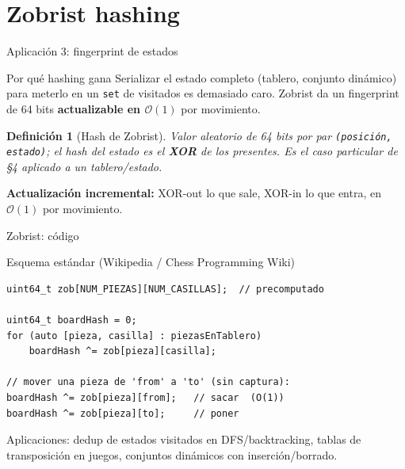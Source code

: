 \documentclass{beamer}
\newtheorem{definicion}{Definición}
\begin{document}
\section{Zobrist hashing}

\begin{frame}{Aplicación 3: fingerprint de estados}
\begin{block}{Por qué hashing gana}
Serializar el estado completo (tablero, conjunto dinámico) para meterlo en un \texttt{set} de visitados es demasiado caro. Zobrist da un fingerprint de 64 bits \textbf{actualizable en $\mathcal{O}(1)$} por movimiento.
\end{block}
\begin{definicion}[Hash de Zobrist]
Valor aleatorio de 64 bits por par \texttt{(posición, estado)}; el hash del estado es el \textbf{XOR} de los presentes. Es el caso particular de \S4 aplicado a un tablero/estado.
\end{definicion}
\textbf{Actualización incremental:} XOR-out lo que sale, XOR-in lo que entra, en $\mathcal{O}(1)$ por movimiento.
\end{frame}

\begin{frame}[fragile]{Zobrist: código}
\begin{exampleblock}{Esquema estándar (Wikipedia / Chess Programming Wiki)}
\begin{verbatim}
uint64_t zob[NUM_PIEZAS][NUM_CASILLAS];  // precomputado

uint64_t boardHash = 0;
for (auto [pieza, casilla] : piezasEnTablero)
    boardHash ^= zob[pieza][casilla];

// mover una pieza de 'from' a 'to' (sin captura):
boardHash ^= zob[pieza][from];   // sacar  (O(1))
boardHash ^= zob[pieza][to];     // poner
\end{verbatim}
\end{exampleblock}
Aplicaciones: dedup de estados visitados en DFS/backtracking, tablas de transposición en juegos, conjuntos dinámicos con inserción/borrado.
\end{frame}
\end{document}
